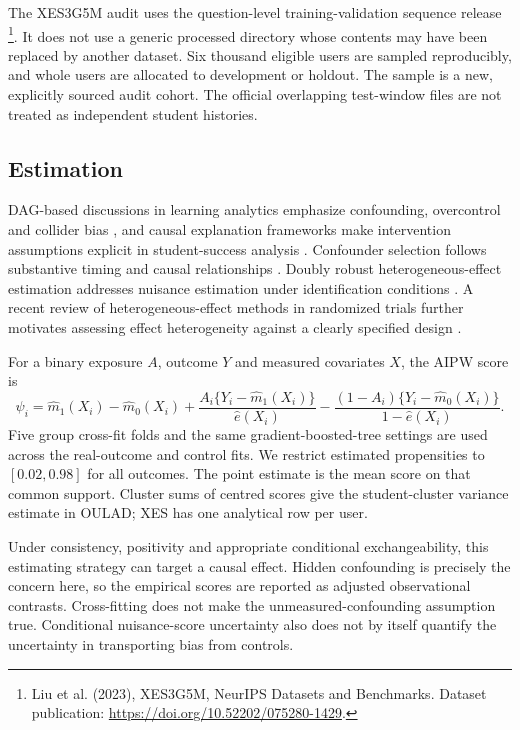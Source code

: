The XES3G5M audit uses the question-level training-validation sequence release \footnote{Liu et al. (2023), XES3G5M, NeurIPS Datasets and Benchmarks. Dataset publication: \url{https://doi.org/10.52202/075280-1429}.}. It does not use a generic processed directory whose contents may have been replaced by another dataset. Six thousand eligible users are sampled reproducibly, and whole users are allocated to development or holdout. The sample is a new, explicitly sourced audit cohort. The official overlapping test-window files are not treated as independent student histories.

\subsection{Estimation}
DAG-based discussions in learning analytics emphasize confounding, overcontrol and collider bias \cite{weidlich2022}, and causal explanation frameworks make intervention assumptions explicit in student-success analysis \cite{cohausz2022}. Confounder selection follows substantive timing and causal relationships \cite{inoue2025}. Doubly robust heterogeneous-effect estimation addresses nuisance estimation under identification conditions \cite{kennedy2023}. A recent review of heterogeneous-effect methods in randomized trials further motivates assessing effect heterogeneity against a clearly specified design \cite{inoue2024}.



For a binary exposure $A$, outcome $Y$ and measured covariates $X$, the AIPW score is
\[
\psi_i=\widehat m_1(X_i)-\widehat m_0(X_i)
+\frac{A_i\{Y_i-\widehat m_1(X_i)\}}{\widehat e(X_i)}
-\frac{(1-A_i)\{Y_i-\widehat m_0(X_i)\}}{1-\widehat e(X_i)}.
\]
Five group cross-fit folds and the same gradient-boosted-tree settings are used across the real-outcome and control fits. We restrict estimated propensities to $[0.02,0.98]$ for all outcomes. The point estimate is the mean score on that common support. Cluster sums of centred scores give the student-cluster variance estimate in OULAD; XES has one analytical row per user.

Under consistency, positivity and appropriate conditional exchangeability, this estimating strategy can target a causal effect. Hidden confounding is precisely the concern here, so the empirical scores are reported as adjusted observational contrasts. Cross-fitting does not make the unmeasured-confounding assumption true. Conditional nuisance-score uncertainty also does not by itself quantify the uncertainty in transporting bias from controls.

